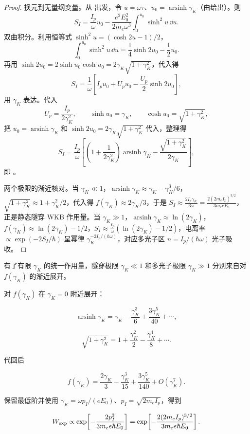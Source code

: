\begin{proof}
换元到无量纲变量。从  出发，令 \(u=\omega\tau\)、\(u_0=\operatorname{arsinh}\gamma_K\)（由给出）。则
\[
S_I
=\frac{I_p}{\omega}u_0
-
\frac{e^2E_0^2}{2m_e\omega^3}
\int_0^{u_0}\sinh^2u\,\dd u.
\]
双曲积分。利用恒等式 $\sinh^2u=(\cosh 2u-1)/2$，
\[
\int_0^{u_0}\sinh^2u\,\dd u
=\frac14\sinh 2u_0-\frac12u_0.
\]
再用 $\sinh 2u_0=2\sinh u_0\cosh u_0=2\gamma_K\sqrt{1+\gamma_K^2}$，代入得
\[
S_I
=\frac1\omega
\left[
I_pu_0+U_pu_0-\frac{U_p}{2}\sinh 2u_0
\right],
\]
用 \(\gamma_K\) 表达。代入
\[
U_p=\frac{I_p}{2\gamma_K^2},
\qquad
\sinh u_0=\gamma_K,
\qquad
\cosh u_0=\sqrt{1+\gamma_K^2},
\]
把 $u_0=\operatorname{arsinh}\gamma_K$ 和 $\sinh 2u_0=2\gamma_K\sqrt{1+\gamma_K^2}$ 代入，整理得
\[
S_I
=\frac{I_p}{\omega}
\left[
\left(1+\frac{1}{2\gamma_K^2}\right)\operatorname{arsinh}\gamma_K
-\frac{\sqrt{1+\gamma_K^2}}{2\gamma_K}
\right],
\]
即 。

两个极限的渐近核对。当 $\gamma_K\ll1$，$\operatorname{arsinh}\gamma_K\approx\gamma_K-\gamma_K^3/6$，$\sqrt{1+\gamma_K^2}\approx1+\gamma_K^2/2$，代入得 $f(\gamma_K)\approx 2\gamma_K/3$，于是 $S_I\approx \frac{2I_p\gamma_K}{3\omega}=\frac{2(2m_eI_p)^{3/2}}{3m_e e E_0}$，正是静态隧穿 WKB 作用量。当 $\gamma_K\gg1$，$\operatorname{arsinh}\gamma_K\approx\ln(2\gamma_K)$，$f(\gamma_K)\approx\ln(2\gamma_K)-1/2$，$S_I\approx \frac{I_p}{\omega}(\ln(2\gamma_K)-1/2)$，电离率 $\propto\exp(-2S_I/\hbar)$ 呈幂律 $\gamma_K^{-2I_p/(\hbar\omega)}$，对应多光子区 $n=I_p/(\hbar\omega)$ 光子吸收。


\end{proof}

有了有限 $\gamma_K$ 的统一作用量，隧穿极限 $\gamma_K\ll1$ 和多光子极限 $\gamma_K\gg1$ 分别来自对 $f(\gamma_K)$ 的渐近展开。

对 \(f(\gamma_K)\) 在 \(\gamma_K=0\) 附近展开：

\[
\operatorname{arsinh}\gamma_K
=\gamma_K-\frac{\gamma_K^3}{6}+\frac{3\gamma_K^5}{40}+\cdots,
\]

\[
\sqrt{1+\gamma_K^2}
=1+\frac{\gamma_K^2}{2}-\frac{\gamma_K^4}{8}+\cdots.
\]

代回后

\[
f(\gamma_K)
=\frac{2\gamma_K}{3}
-\frac{\gamma_K^3}{15}
+\frac{3\gamma_K^5}{140}
+O(\gamma_K^7).
\]

保留最低阶并使用 \(\gamma_K=\omega p_I/(eE_0)\)、\(p_I=\sqrt{2m_eI_p}\)，得到

\begin{equation}
W_{\rm exp}
\propto
\exp\!\left[-\frac{2p_I^3}{3m_e e\hbar E_0}\right]
=
\exp\!\left[-\frac{2(2m_eI_p)^{3/2}}{3m_e e\hbar E_0}\right].
\label{eq:static-tunnel-exponent}
\end{equation}

